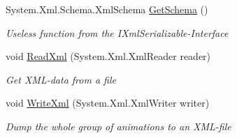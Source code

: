 \begin{DoxyCompactItemize}
\item 
System.\-Xml.\-Schema.\-Xml\-Schema \hyperlink{class_gruppe22_1_1_client_1_1_tile_object_ab7ffb591c1031161c6b986a1de374cc4}{Get\-Schema} ()
\begin{DoxyCompactList}\small\item\em Useless function from the I\-Xml\-Serializable-\/\-Interface \end{DoxyCompactList}\item 
void \hyperlink{class_gruppe22_1_1_client_1_1_tile_object_a5c2e19f632fe0524448e77604ad0653a}{Read\-Xml} (System.\-Xml.\-Xml\-Reader reader)
\begin{DoxyCompactList}\small\item\em Get X\-M\-L-\/data from a file \end{DoxyCompactList}\item 
void \hyperlink{class_gruppe22_1_1_client_1_1_tile_object_abed9b73a739881a1fa04fcb4cd323df2}{Write\-Xml} (System.\-Xml.\-Xml\-Writer writer)
\begin{DoxyCompactList}\small\item\em Dump the whole group of animations to an X\-M\-L-\/file \end{DoxyCompactList}\end{DoxyCompactItemize}
